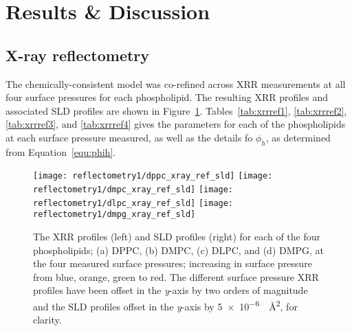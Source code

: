 \section{Results \& Discussion}
\subsection{X-ray reflectometry}
The chemically-consistent model was co-refined across XRR measurements at all four surface pressures for each phospholipid.
The resulting XRR profiles and associated SLD profiles are shown in Figure~\ref{fig:xrrref}.
Tables~\ref{tab:xrrref1}, \ref{tab:xrrref2}, \ref{tab:xrrref3}, and \ref{tab:xrrref4} gives the parameters for each of the phospholipids at each surface pressure measured, as well as the details fo $\phi_h$, as determined from Equation~\ref{equ:phih}.
%
\begin{figure}
    \centering
    \texttt{[image: reflectometry1/dppc\_xray\_ref\_sld]}
    \texttt{[image: reflectometry1/dmpc\_xray\_ref\_sld]}
    \texttt{[image: reflectometry1/dlpc\_xray\_ref\_sld]}
    \texttt{[image: reflectometry1/dmpg\_xray\_ref\_sld]}
    \caption{The XRR profiles (left) and SLD profiles (right) for each of the four phospholipids; (a) DPPC, (b) DMPC, (c) DLPC, and (d) DMPG, at the four measured surface pressures; increasing in surface pressure from blue, orange, green to red. The different surface pressure XRR profiles have been offset in the \emph{y}-axis by two orders of magnitude and the SLD profiles offset in the \emph{y}-axis by \SI{5e-6}{\per\angstrom\squared}, for clarity.}
    \label{fig:xrrref}
\end{figure}
%
%
